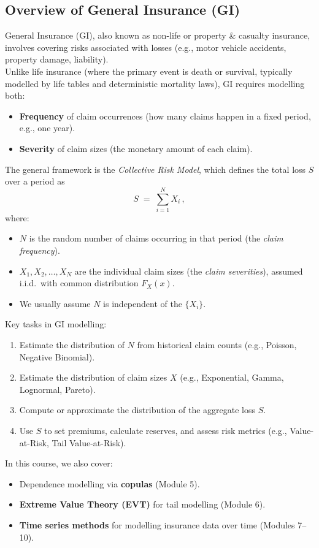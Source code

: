 \documentclass[11pt]{article}
\begin{document}
\subsection{Overview of General Insurance (GI)}
\noindent General Insurance (GI), also known as non-life or property \& casualty insurance, involves covering risks associated with losses (e.g., motor vehicle accidents, property damage, liability).\\
\noindent Unlike life insurance (where the primary event is death or survival, typically modelled by life tables and deterministic mortality laws), GI requires modelling both:
\begin{itemize}
  \item \textbf{Frequency} of claim occurrences (how many claims happen in a fixed period, e.g., one year).
  \item \textbf{Severity} of claim sizes (the monetary amount of each claim).
\end{itemize}
\noindent The general framework is the \textit{Collective Risk Model}, which defines the total loss \(S\) over a period as
\[
S \;=\; \sum_{i=1}^{N} X_i \,,
\]
where:
\begin{itemize}
  \item \(N\) is the random number of claims occurring in that period (the \textit{claim frequency}).
  \item \(X_1, X_2, \dots, X_N\) are the individual claim sizes (the \textit{claim severities}), assumed i.i.d.\ with common distribution \(F_X(x)\).
  \item We usually assume \(N\) is independent of the \(\{X_i\}\).
\end{itemize}
\noindent Key tasks in GI modelling:
\begin{enumerate}
  \item Estimate the distribution of \(N\) from historical claim counts (e.g., Poisson, Negative Binomial).
  \item Estimate the distribution of claim sizes \(X\) (e.g., Exponential, Gamma, Lognormal, Pareto).
  \item Compute or approximate the distribution of the aggregate loss \(S\).
  \item Use \(S\) to set premiums, calculate reserves, and assess risk metrics (e.g., Value-at-Risk, Tail Value-at-Risk).
\end{enumerate}
\noindent In this course, we also cover:
\begin{itemize}
  \item Dependence modelling via \textbf{copulas} (Module 5).
  \item \textbf{Extreme Value Theory (EVT)} for tail modelling (Module 6).
  \item \textbf{Time series methods} for modelling insurance data over time (Modules 7–10).
\end{itemize}
\end{document}
